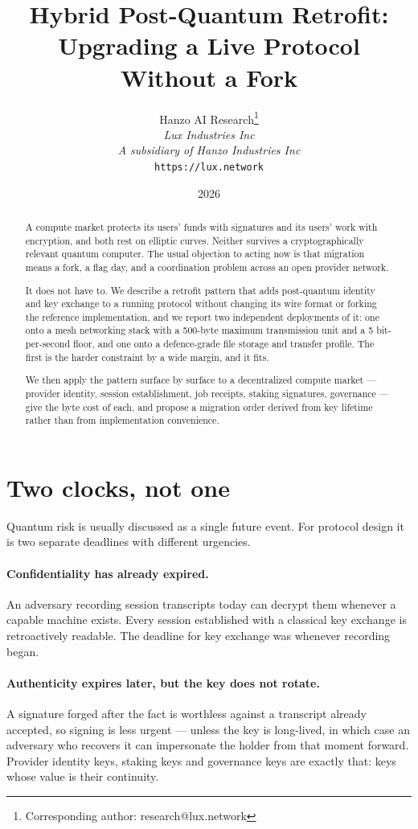 \documentclass[11pt,a4paper]{article}
\title{Hybrid Post-Quantum Retrofit:\\Upgrading a Live Protocol Without a Fork}
\author{
Hanzo AI Research\thanks{Corresponding author: research@lux.network} \\
\textit{Lux Industries Inc} \\
\textit{A subsidiary of Hanzo Industries Inc} \\
\texttt{https://lux.network}
}
\date{2026}
\begin{document}
\hanzocoverpage

\begin{abstract}
A compute market protects its users' funds with signatures and its users' work
with encryption, and both rest on elliptic curves. Neither survives a
cryptographically relevant quantum computer. The usual objection to acting now
is that migration means a fork, a flag day, and a coordination problem across an
open provider network.

It does not have to. We describe a retrofit pattern that adds post-quantum
identity and key exchange to a running protocol without changing its wire format
or forking the reference implementation, and we report two independent
deployments of it: one onto a mesh networking stack with a 500-byte maximum
transmission unit and a 5 bit-per-second floor, and one onto a
defence-grade file storage and transfer profile. The first is the harder
constraint by a wide margin, and it fits.

We then apply the pattern surface by surface to a decentralized compute market
--- provider identity, session establishment, job receipts, staking signatures,
governance --- give the byte cost of each, and propose a migration order derived
from key lifetime rather than from implementation convenience.
\end{abstract}

\tableofcontents
\newpage

\section{Two clocks, not one}

Quantum risk is usually discussed as a single future event. For protocol design
it is two separate deadlines with different urgencies.

\paragraph{Confidentiality has already expired.} An adversary recording session
transcripts today can decrypt them whenever a capable machine exists. Every
session established with a classical key exchange is retroactively readable. The
deadline for key exchange was whenever recording began.

\paragraph{Authenticity expires later, but the key does not rotate.} A signature
forged after the fact is worthless against a transcript already accepted, so
signing is less urgent --- unless the key is long-lived, in which case an
adversary who recovers it can impersonate the holder from that moment forward.
Provider identity keys, staking keys and governance keys are exactly that: keys
whose value is their continuity.
\end{document}
